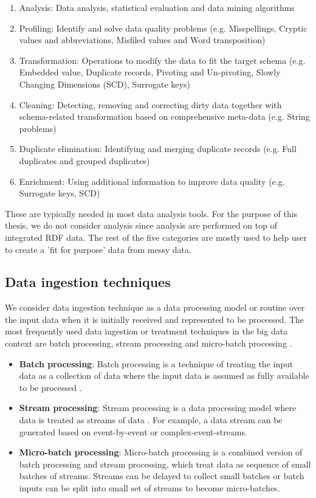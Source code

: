 \begin{enumerate}
\item Analysis: Data analysis, statistical evaluation and data mining algorithms
\item Profiling: Identify and solve data quality problems (e.g. Misspellings, Cryptic values and abbreviations, Misfiled values and Word transposition) \cite{datacleaningprobsandapproaches}
\item Transformation: Operations to modify the data to fit the target schema (e.g. Embedded value,  Duplicate records, Pivoting and Un-pivoting, Slowly Changing Dimensions (SCD), Surrogate keys) \cite{datacleaningprobsandapproaches}\cite{ETL}
\item Cleaning: Detecting, removing and correcting dirty data together with schema-related transformation based on comprehensive meta-data (e.g. String problems) \cite{datacleaningprobsandapproaches}
\item Duplicate elimination: Identifying and merging duplicate records (e.g. Full duplicates and grouped duplicates)
\item Enrichment: Using additional information to improve data quality (e.g. Surrogate keys, SCD) \cite{ETL}
\end{enumerate}
\noindent These are typically needed in most data analysis tools. For the purpose of this thesis, we do not consider analysis since analysis are performed on top of integrated RDF data. The rest of the five categories are mostly used to help user to create a 'fit for purpose' data from messy data. 
\subsection{Data ingestion techniques}
We consider data ingestion technique as a data processing model or routine over the input data when it is initially received and represented to be processed. The most frequently used data ingestion or treatment techniques in the big data context are batch processing, stream processing and micro-batch processing \cite{dataflow}. 
\begin{itemize}
\item \textbf{Batch processing}: Batch processing is a technique of treating the input data as a collection of data where the input data is assumed as fully available to be processed \cite{Sims-387}.
\item \textbf{Stream processing}:  Stream processing is a data processing model where data is treated as streams of data \cite{beyondbatchprocessing}. For example, a data stream can be generated based on event-by-event or complex-event-streams.
\item \textbf{Micro-batch processing}: Micro-batch processing is a combined version of batch processing and stream processing, which treat data as sequence of small batches of streams. Streams can be delayed to collect small batches or batch inputs can be split into small set of streams to become micro-batches. 
\end{itemize}
